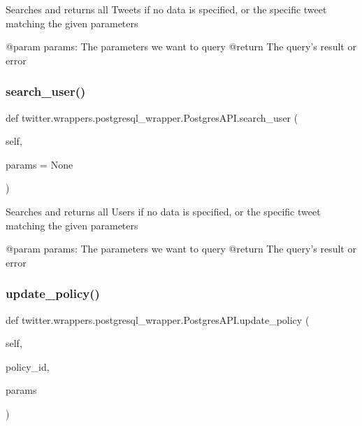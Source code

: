 \begin{DoxyVerb}Searches and returns all Tweets if no data is specified, or the specific tweet matching the given parameters

@param params: The parameters we want to query
@return The query's result or error
\end{DoxyVerb}
 \mbox{\label{classtwitter_1_1wrappers_1_1postgresql__wrapper_1_1PostgresAPI_a84fa6c90c91f88a68284fba6812b043f}} 
\subsubsection{\texorpdfstring{search\+\_\+user()}{search\_user()}}
{\footnotesize\ttfamily def twitter.\+wrappers.\+postgresql\+\_\+wrapper.\+Postgres\+A\+P\+I.\+search\+\_\+user (\begin{DoxyParamCaption}\item[{}]{self,  }\item[{}]{params = {\ttfamily None} }\end{DoxyParamCaption})}

\begin{DoxyVerb}Searches and returns all Users if no data is specified, or the specific tweet matching the given parameters

@param params: The parameters we want to query
@return The query's result or error
\end{DoxyVerb}
 \mbox{\label{classtwitter_1_1wrappers_1_1postgresql__wrapper_1_1PostgresAPI_aa32ee622eb02190f09ec38919123bbb5}} 
\subsubsection{\texorpdfstring{update\+\_\+policy()}{update\_policy()}}
{\footnotesize\ttfamily def twitter.\+wrappers.\+postgresql\+\_\+wrapper.\+Postgres\+A\+P\+I.\+update\+\_\+policy (\begin{DoxyParamCaption}\item[{}]{self,  }\item[{}]{policy\+\_\+id,  }\item[{}]{params }\end{DoxyParamCaption})}

